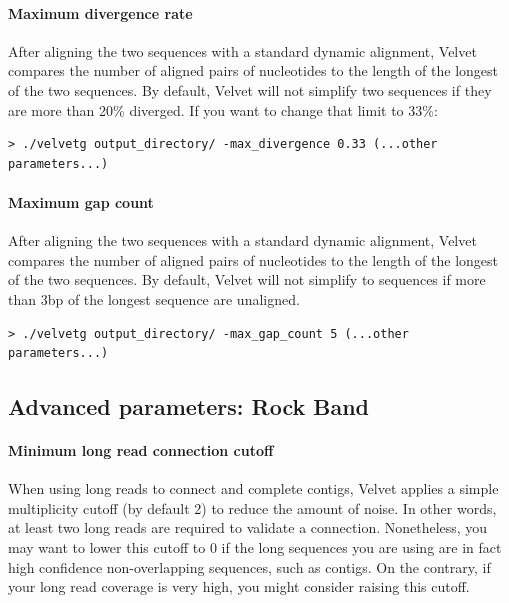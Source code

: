 \documentclass{article}
\begin{document}
\paragraph{Maximum divergence rate}

After aligning the two sequences with a standard dynamic alignment, Velvet compares the number of aligned pairs of nucleotides to the length of the longest of the two sequences. By default, Velvet will not simplify two sequences if they are more than 20\% diverged. If you want to change that limit to 33\%:

\begin{verbatim}
> ./velvetg output_directory/ -max_divergence 0.33 (...other parameters...)
\end{verbatim} 

\paragraph{Maximum gap count}

After aligning the two sequences with a standard dynamic alignment, Velvet compares the number of aligned pairs of nucleotides to the length of the longest of the two sequences. By default, Velvet will not simplify to sequences if more than 3bp of the longest sequence are unaligned.

\begin{verbatim}
> ./velvetg output_directory/ -max_gap_count 5 (...other parameters...)
\end{verbatim} 

\subsection{Advanced parameters: Rock Band}

\paragraph{Minimum long read connection cutoff}

When using long reads to connect and complete contigs, Velvet applies a simple multiplicity cutoff (by default 2) to reduce the amount of noise. In other words, at least two long reads are required to validate a connection. Nonetheless, you may want to lower this cutoff to 0 if the long sequences you are using are in fact high confidence non-overlapping sequences, such as contigs. On the contrary, if your long read coverage is very high, you might consider raising this cutoff.
\end{document}
